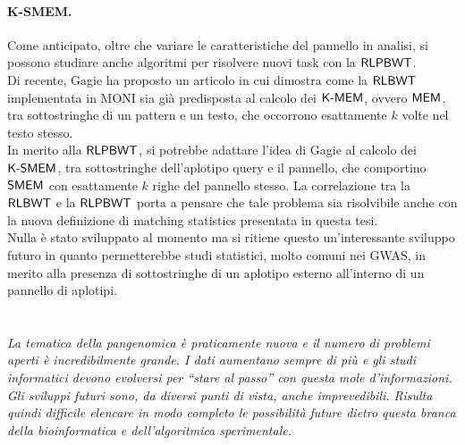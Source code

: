 \paragraph{K-SMEM.}
Come anticipato, oltre che variare le caratteristiche del pannello in analisi,
si possono studiare anche algoritmi per risolvere nuovi task con la
$\mbox{\rm {\sf RLPBWT}}$.\\ 
Di recente, Gagie \cite{kmems} ha proposto un articolo in cui dimostra come
la $\mbox{\rm {\sf RLBWT}}$ implementata in MONI \cite{moni} sia già predisposta al
calcolo dei $\mbox{\rm {\sf K-MEM}}$, ovvero $\mbox{\rm {\sf MEM}}$, tra sottostringhe di un
pattern e un testo, che occorrono esattamente $k$ volte nel testo stesso.\\
In merito alla $\mbox{\rm {\sf RLPBWT}}$, si potrebbe adattare l'idea di Gagie al calcolo
dei $\mbox{\rm {\sf K-SMEM}}$, tra sottostringhe dell'aplotipo query e il pannello, che
comportino $\mbox{\rm {\sf SMEM}}$ con esattamente $k$ righe del pannello stesso. La
correlazione tra la $\mbox{\rm {\sf RLBWT}}$ e la $\mbox{\rm {\sf RLPBWT}}$ 
porta a pensare che tale problema sia risolvibile anche con la nuova definizione
di matching statistics presentata in questa tesi.\\
Nulla è stato sviluppato al momento ma si ritiene questo
un'interessante sviluppo futuro in quanto permetterebbe studi statistici, molto
comuni nei GWAS, in merito alla presenza di sottostringhe di un
aplotipo esterno all'interno di un pannello di aplotipi.\\
\\
\\
\textit{La tematica della \emph{pangenomica} è praticamente nuova e il numero di
problemi aperti è incredibilmente grande. I dati aumentano sempre di più e gli
studi informatici devono evolversi per ``stare al passo'' con questa mole
d'informazioni. Gli \emph{sviluppi futuri} sono, da diversi punti di vista,
anche imprevedibili. Risulta quindi difficile elencare in modo completo le
possibilità future dietro questa branca della bioinformatica e dell'algoritmica
sperimentale.}
